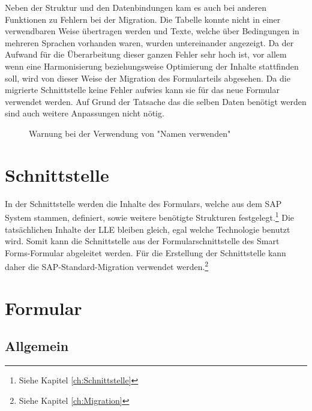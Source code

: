 Neben der Struktur und den Datenbindungen kam es auch bei anderen Funktionen zu Fehlern bei der Migration. Die Tabelle konnte nicht in einer verwendbaren Weise übertragen werden und Texte, welche über Bedingungen in mehreren Sprachen vorhanden waren, wurden untereinander angezeigt. Da der Aufwand für die Überarbeitung dieser ganzen Fehler sehr hoch ist, vor allem wenn eine Harmonisierung beziehungsweise Optimierung der Inhalte stattfinden soll, wird von dieser Weise der Migration des Formularteils abgesehen. Da die migrierte Schnittstelle keine Fehler aufwies kann sie für das neue Formular verwendet werden. Auf Grund der Tatsache das die selben Daten benötigt werden sind auch weitere Anpassungen nicht nötig.
\begin{figure}[ht]
	\centering
	\caption{Warnung bei der Verwendung von "Namen verwenden"}
	\label{Namen-Fehler}
\end{figure}

\section{Schnittstelle}

In der Schnittstelle werden die Inhalte des Formulars, welche aus dem SAP System stammen, definiert, sowie weitere benötigte Strukturen festgelegt.\footnote{Siehe Kapitel \ref{ch:Schnittstelle}}
Die tatsächlichen Inhalte der \ac{LLE} bleiben gleich, egal welche Technologie benutzt wird. Somit kann die Schnittstelle aus der Formularschnittstelle des Smart Forms-Formular abgeleitet werden. Für die Erstellung der Schnittstelle kann daher die SAP-Standard-Migration verwendet werden.\footnote{Siehe Kapitel \ref{ch:Migration}}


\section{Formular}

\subsection{Allgemein}

